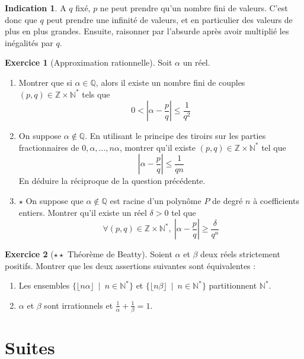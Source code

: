 \documentclass[french]{book}
\newcommand{\N}{\mathbb{N}}
\newcommand{\Z}{\mathbb{Z}}
\newcommand{\Q}{\mathbb{Q}}
\newcommand{\st}{^*}
\theoremstyle{definition}
\newtheorem{ex}{Exercice}[chapter]
\theoremstyle{theorem}
\newtheorem*{ind}{Indication}
\theoremstyle{remark}
\begin{document}
\begin{ind}
	A $q$ fixé, $p$ ne peut prendre qu'un nombre fini de valeurs. C'est donc que $q$ peut prendre une infinité de valeurs, et en particulier des valeurs de plus en plus grandes. Ensuite, raisonner par l'absurde après avoir multiplié les inégalités par $q$.
\end{ind}

\begin{ex}[Approximation rationnelle]
	Soit $\alpha$ un réel.
	\begin{enumerate}
		\item Montrer que si $\alpha\in\Q$, alors il existe un nombre fini de couples $(p,q)\in\Z\times\N\st$ tels que $$0<\left\lvert\alpha-\frac{p}{q}\right\rvert\leqslant\frac{1}{q^2}$$
		\item On suppose $\alpha\notin\Q$. En utilisant le principe des tiroirs sur les parties fractionnaires de $0,\alpha,\ldots,n\alpha$, montrer qu'il existe $(p,q)\in\Z\times\N\st$ tel que $$\left\lvert\alpha-\frac{p}{q}\right\rvert\leqslant\frac{1}{qn}$$ En déduire la réciproque de la question précédente.
		\item $\star$ On suppose que $\alpha\notin\Q$ est racine d'un polynôme $P$ de degré $n$ à coefficients entiers. Montrer qu'il existe un réel $\delta>0$ tel que $$\forall(p,q)\in\Z\times\N\st,\ \left\lvert\alpha-\frac{p}{q}\right\rvert\geqslant\frac{\delta}{q^n}$$
	\end{enumerate}
\end{ex}

\begin{ex}[$\star\star$ Théorème de Beatty]
	Soient $\alpha$ et $\beta$ deux réels strictement positifs. Montrer que les deux assertions suivantes sont équivalentes : 
	\begin{enumerate}[label=\roman*)]
		\item Les ensembles $\{\lfloor n\alpha\rfloor\ \mid\ n\in\N\st\}$ et $\{\lfloor n\beta\rfloor\ \mid\ n\in\N\st\}$ partitionnent $\N\st$.
		\item $\alpha$ et $\beta$ sont irrationnels et $\displaystyle\frac{1}{\alpha}+\frac{1}{\beta}=1$.
	\end{enumerate}
\end{ex}

\section{Suites}
\end{document}
